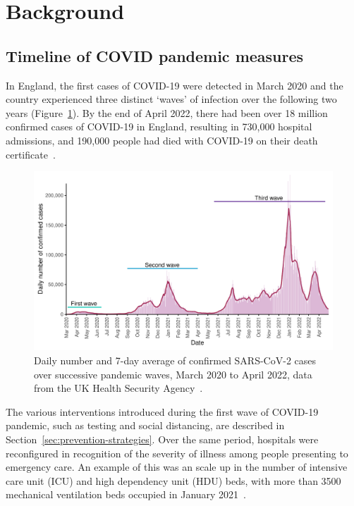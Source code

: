 \section{Background}

\subsection{Timeline of COVID pandemic measures}

In England, the first cases of COVID-19 were detected in March 2020 and the country experienced three distinct `waves' of infection over the following two years (Figure~\ref{fig:pandemic-waves}). By the end of April 2022, there had been over 18 million confirmed cases of COVID-19 in England, resulting in 730,000 hospital admissions, and 190,000 people had died with COVID-19 on their death certificate~\parencite{UK_Government2021-ip}.

\begin{figure}[htbp!]
    \centering
    \includegraphics[width=\textwidth]{pandemic_waves.pdf}
    \caption[Daily number and 7-day average of confirmed SARS-CoV-2 cases over successive pandemic waves]{Daily number and 7-day average of confirmed SARS-CoV-2 cases over successive pandemic waves, March 2020 to April 2022, data from the UK Health Security Agency~\parencite{UK_Government2021-ip}.}\label{fig:pandemic-waves}
\end{figure}

The various interventions introduced during the first wave of COVID-19 pandemic, such as testing and social distancing, are described in Section~\ref{sec:prevention-strategies}. Over the same period, hospitals were reconfigured in recognition of the severity of illness among people presenting to emergency care. An example of this was an scale up in the number of intensive care unit (ICU) and high dependency unit (HDU) beds, with more than 3500 mechanical ventilation beds occupied in January 2021~\parencite{UK_Government2021-ip}.

